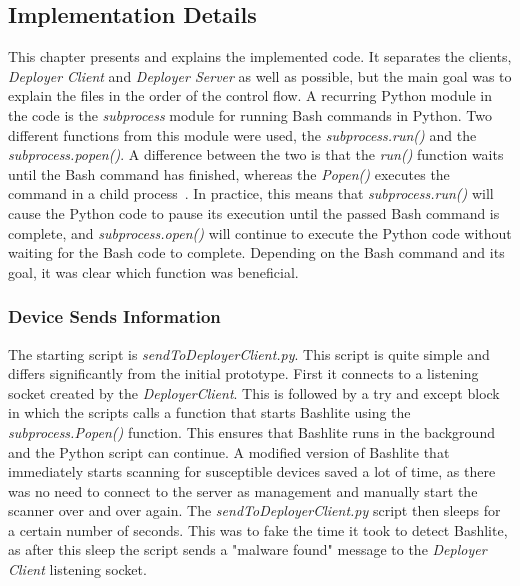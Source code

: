 \subsection{Implementation Details}
This chapter presents and explains the implemented code. It separates the clients, \textit{Deployer Client} and \textit{Deployer Server} as well as possible, but the main goal was to explain the files in the order of the control flow. A recurring Python module in the code is the \textit{subprocess} module for running Bash commands in Python. Two different functions from this module were used, the \textit{subprocess.run()} and the \textit{subprocess.popen()}. A difference between the two is that the \textit{run()} function waits until the Bash command has finished, whereas the \textit{Popen()} executes the command in a child process~\cite{website:pythonSubprocess}. In practice, this means that \textit{subprocess.run()} will cause the Python code to pause its execution until the passed Bash command is complete, and \textit{subprocess.open()} will continue to execute the Python code without waiting for the Bash code to complete. Depending on the Bash command and its goal, it was clear which function was beneficial. 


\subsubsection{Device Sends Information} 
The starting script is \textit{sendToDeployerClient.py}. This script is quite simple and differs significantly from the initial prototype. First it connects to a listening socket created by the \textit{DeployerClient}. This is followed by a try and except block in which the scripts calls a function that starts Bashlite using the \textit{subprocess.Popen()} function. This ensures that Bashlite runs in the background and the Python script can continue. A modified version of Bashlite that immediately starts scanning for susceptible devices saved a lot of time, as there was no need to connect to the server as management and manually start the scanner over and over again. The \textit{sendToDeployerClient.py} script then sleeps for a certain number of seconds. This was to fake the time it took to detect Bashlite, as after this sleep the script sends a "malware found" message to the \textit{Deployer Client} listening socket.



